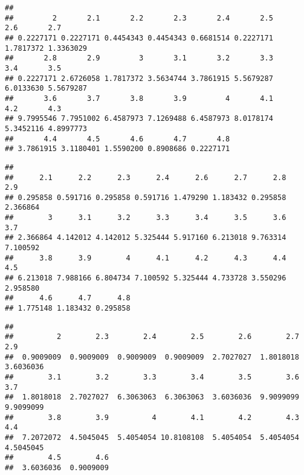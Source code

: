 \documentclass[
]{article}
\newenvironment{Shaded}{\begin{snugshade}}{\end{snugshade}}
\newcommand{\DecValTok}[1]{\textcolor[rgb]{0.00,0.00,0.81}{#1}}
\newcommand{\KeywordTok}[1]{\textcolor[rgb]{0.13,0.29,0.53}{\textbf{#1}}}
\newcommand{\NormalTok}[1]{#1}
\newcommand{\OperatorTok}[1]{\textcolor[rgb]{0.81,0.36,0.00}{\textbf{#1}}}
\newcommand{\StringTok}[1]{\textcolor[rgb]{0.31,0.60,0.02}{#1}}
\begin{document}
\begin{verbatim}
## 
##         2       2.1       2.2       2.3       2.4       2.5       2.6       2.7 
## 0.2227171 0.2227171 0.4454343 0.4454343 0.6681514 0.2227171 1.7817372 1.3363029 
##       2.8       2.9         3       3.1       3.2       3.3       3.4       3.5 
## 0.2227171 2.6726058 1.7817372 3.5634744 3.7861915 5.5679287 6.0133630 5.5679287 
##       3.6       3.7       3.8       3.9         4       4.1       4.2       4.3 
## 9.7995546 7.7951002 6.4587973 7.1269488 6.4587973 8.0178174 5.3452116 4.8997773 
##       4.4       4.5       4.6       4.7       4.8 
## 3.7861915 3.1180401 1.5590200 0.8908686 0.2227171
\end{verbatim}

\begin{Shaded}
\end{Shaded}

\begin{verbatim}
## 
##      2.1      2.2      2.3      2.4      2.6      2.7      2.8      2.9 
## 0.295858 0.591716 0.295858 0.591716 1.479290 1.183432 0.295858 2.366864 
##        3      3.1      3.2      3.3      3.4      3.5      3.6      3.7 
## 2.366864 4.142012 4.142012 5.325444 5.917160 6.213018 9.763314 7.100592 
##      3.8      3.9        4      4.1      4.2      4.3      4.4      4.5 
## 6.213018 7.988166 6.804734 7.100592 5.325444 4.733728 3.550296 2.958580 
##      4.6      4.7      4.8 
## 1.775148 1.183432 0.295858
\end{verbatim}

\begin{Shaded}
\end{Shaded}

\begin{verbatim}
## 
##          2        2.3        2.4        2.5        2.6        2.7        2.9 
##  0.9009009  0.9009009  0.9009009  0.9009009  2.7027027  1.8018018  3.6036036 
##        3.1        3.2        3.3        3.4        3.5        3.6        3.7 
##  1.8018018  2.7027027  6.3063063  6.3063063  3.6036036  9.9099099  9.9099099 
##        3.8        3.9          4        4.1        4.2        4.3        4.4 
##  7.2072072  4.5045045  5.4054054 10.8108108  5.4054054  5.4054054  4.5045045 
##        4.5        4.6 
##  3.6036036  0.9009009
\end{verbatim}
\end{document}
